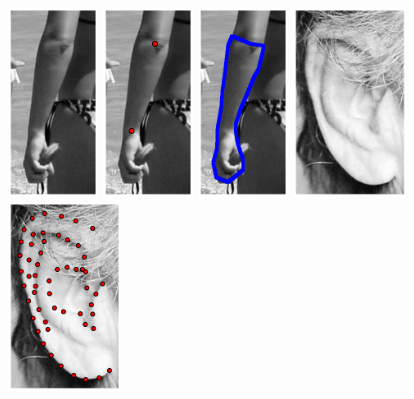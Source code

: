 \begin{figure}
    \centering
    \includegraphics[height=5.0cm]{resources/Annotation_Correction/Fig_Intro/intro_2_0}
    \hfill
    \includegraphics[height=5.0cm]{resources/Annotation_Correction/Fig_Intro/intro_2_1}
    \hfill
    \includegraphics[height=5.0cm]{resources/Annotation_Correction/Fig_Intro/intro_2_2}
    \hfill
    \includegraphics[height=5.0cm]{resources/Annotation_Correction/Fig_Intro/intro_1_0}
    \hfill
    \includegraphics[height=5.0cm]{resources/Annotation_Correction/Fig_Intro/intro_1_1}

\end{figure}

